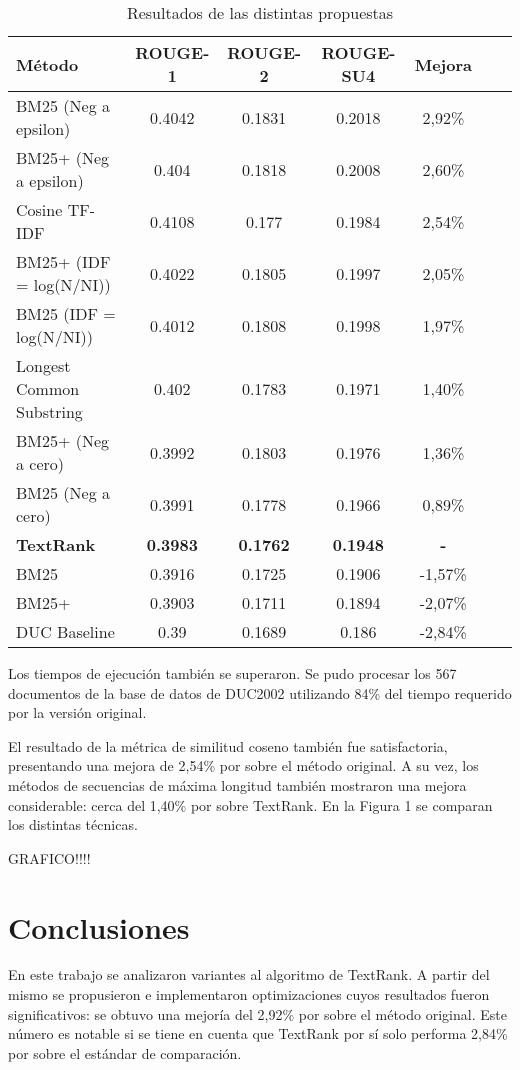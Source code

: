 \documentclass{llncs}
\begin{document}
\begin{table}
\caption{Resultados de las distintas propuestas}
\begin{center}
\begin{tabular}{l*{5}{c}r}
\hline
\rule{0pt}{12pt}
Método & ROUGE-1 & ROUGE-2 & ROUGE-SU4 & Mejora \\[2pt]
\hline\rule{0pt}{12pt}
BM25 (Neg a epsilon) & 0.4042 & 0.1831 & 0.2018 & 2,92\% \\
BM25+ (Neg a epsilon) & 0.404 & 0.1818 & 0.2008 & 2,60\% \\
Cosine TF-IDF & 0.4108 & 0.177 & 0.1984 & 2,54\% \\
BM25+ (IDF = log(N/NI)) & 0.4022 & 0.1805 & 0.1997 & 2,05\% \\ 
BM25 (IDF = log(N/NI)) & 0.4012 & 0.1808 & 0.1998 & 1,97\% \\ 
Longest Common Substring & 0.402 & 0.1783 & 0.1971 & 1,40\% \\
BM25+ (Neg a cero) & 0.3992 & 0.1803 & 0.1976 & 1,36\% \\ 
BM25 (Neg a cero) & 0.3991 & 0.1778 & 0.1966 & 0,89\% \\
\textbf{TextRank} & \textbf{0.3983} & \textbf{0.1762} & \textbf{0.1948} & \textbf{-}\\
BM25 & 0.3916 & 0.1725 & 0.1906 & -1,57\% \\
BM25+ & 0.3903 & 0.1711 & 0.1894 & -2,07\% \\
DUC Baseline & 0.39 & 0.1689 & 0.186 & -2,84\% \\ [2pt]
\hline
\end{tabular}
\end{center}
\end{table}


Los tiempos de ejecución también se superaron. Se pudo procesar los 567 documentos de la base de datos de DUC2002 utilizando 84\% del tiempo requerido por la versión original.

El resultado de la métrica de similitud coseno también fue satisfactoria, presentando una mejora de 2,54\% por sobre el método original. A su vez, los métodos de secuencias de máxima longitud también mostraron una mejora considerable: cerca del 1,40\% por sobre TextRank. En la Figura 1 se comparan los distintas técnicas.

GRAFICO!!!!

\section{Conclusiones}
En este trabajo se analizaron variantes al algoritmo de TextRank. A partir del mismo se propusieron e implementaron optimizaciones cuyos resultados fueron significativos: se obtuvo una mejoría del 2,92\% por sobre el método original. Este número es notable si se tiene en cuenta que TextRank por sí solo performa 2,84\% por sobre el estándar de comparación.
\end{document}
